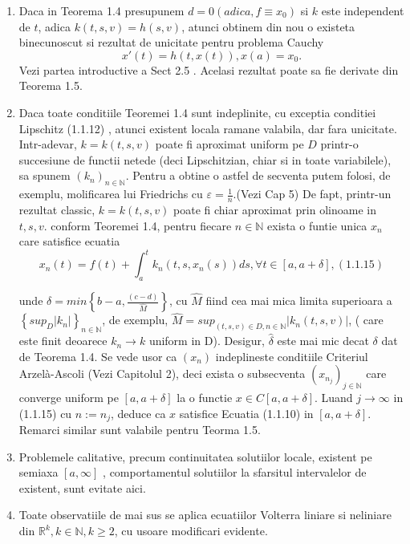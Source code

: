 \documentclass[a4paper,12pt,oneside]{report}
\begin{document}
\begin{enumerate}[1.]
\item Daca in Teorema 1.4 presupunem \(d = 0 ( adica, f \equiv x_{0} )\) si \(k\) este independent de \(t\), adica \(k\left ( t,s,v \right ) = h \left ( s,v \right )\), atunci obtinem din nou o existeta binecunoscut si rezultat de unicitate pentru problema Cauchy 
\begin{displaymath}
  {x}'\left ( t \right ) = h\left ( t,x\left ( t \right ) \right ), x\left ( a \right ) = x_{0}.
\end{displaymath}
Vezi partea introductive a Sect 2.5 . Acelasi rezultat poate sa fie derivate din Teorema 1.5. 
\item Daca toate conditiile Teoremei 1.4 sunt indeplinite, cu exceptia conditiei Lipschitz (1.1.12) , atunci existent locala ramane valabila, dar fara unicitate. Intr-adevar, \(k = k\left ( t,s,v \right )\) poate fi aproximat uniform pe \(D\) printr-o succesiune de functii netede (deci Lipschitzian, chiar si in toate variabilele), sa spunem \(\left ( k_{n} \right )_{n\in \mathbb{N}}\). Pentru a obtine o astfel de secventa putem folosi, de exemplu, molificarea lui Friedrichs cu \(\varepsilon = \frac{1}{n}\).(Vezi Cap 5)  De fapt, printr-un rezultat classic, \(k = k\left ( t,s,v \right )\) poate fi chiar aproximat prin olinoame in \(t,s,v\). conform Teoremei 1.4, pentru fiecare \(n \in \mathbb{N}\) exista o funtie unica \(x_{n}\) care satisfice ecuatia
\begin{displaymath}
  x_{n}\left ( t \right ) = f\left ( t \right ) + \int_{a}^{t}k_{n}\left ( t,s,x_{n}\left ( s \right ) \right )ds, \forall t\in \left [ a,a+\delta  \right ], (1.1.15)
\end{displaymath}

unde \(\delta = min\left \{ b-a, \frac{\left ( c-d \right )}{\hat{M}} \right \}\), cu \(\hat{M}\) fiind cea mai mica limita superioara a \(\left \{ sup_{D} \left | k_{n} \right |\right \}_{n\in \mathbb{N}}\), de exemplu, \(\hat{M} = sup_{\left ( t,s,v \right )\in D, n \in \mathbb{N}}\left | k_{n}\left ( t,s,v \right ) \right |\), ( care este finit deoarece \(k_{n}\rightarrow k\) uniform in D). Desigur, \(\hat{\delta }\) este mai mic decat \({\delta }\) dat de Teorema 1.4. Se vede usor ca \(\left ( x_{n} \right )\)  indeplineste conditiile Criteriul Arzelà-Ascoli (Vezi Capitolul 2), deci exista o subsecventa \(\left ( x_{n_{j}} \right )_{j\in \mathbb{N}}\) care converge uniform pe \(\left [ a, a+ \delta  \right ]\) la o functie \(x \in C \left [ a, a+ \delta  \right ]\). Luand \(j\rightarrow \infty\) in (1.1.15) cu \(n:= n_{j}\), deduce ca \(x\) satisfice Ecuatia (1.1.10) in \(\left [ a,a+ \delta  \right ]\). Remarci similar sunt valabile pentru Teorma 1.5. 
\item Problemele calitative, precum continuitatea solutiilor locale, existent pe semiaxa \(\left [ a, \infty  \right ]\) , comportamentul solutiilor la sfarsitul intervalelor de existent, sunt evitate aici. 
\item Toate observatiile de mai sus se aplica ecuatiilor Volterra liniare si neliniare din \(\mathbb{R}^{k}, k\in \mathbb{N}, k\geq 2\), cu usoare modificari evidente. 
\end{enumerate}
\end{document}
